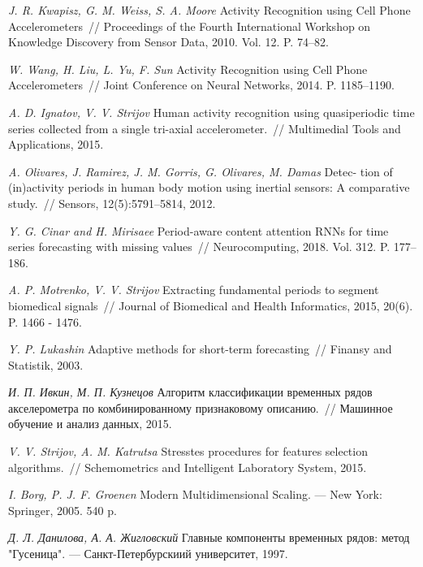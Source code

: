 \documentclass[12pt, twoside]{article}
\numberwithin{equation}{section}
\begin{document}
\begin{thebibliography}{99}
	\textit{J. R. Kwapisz, G. M. Weiss, S. A. Moore} Activity Recognition using Cell Phone Accelerometers~// Proceedings of the Fourth International Workshop on Knowledge Discovery from Sensor Data, 2010. Vol. 12. P. 74--82.
	
	\textit{W. Wang, H. Liu, L. Yu, F. Sun} Activity Recognition using Cell Phone Accelerometers~// Joint Conference on Neural Networks, 2014. P. 1185--1190.
	
	\textit{A. D. Ignatov, V. V. Strijov} Human activity recognition using quasiperiodic time series collected from a single tri-axial accelerometer.~// Multimedial Tools and Applications, 2015.
	
	\textit{A. Olivares, J. Ramirez, J. M. Gorris, G. Olivares, M. Damas} Detec- tion of (in)activity periods in human body motion using inertial sensors: A comparative study.~// Sensors, 12(5):5791–5814, 2012.
	
	\textit{Y. G. Cinar and H. Mirisaee} Period-aware content attention RNNs for time series forecasting with missing values~// Neurocomputing, 2018. Vol. 312. P. 177--186.
	
	\textit{A. P. Motrenko, V. V. Strijov} Extracting fundamental periods to segment biomedical signals~// Journal of Biomedical and Health Informatics, 2015, 20(6). P. 1466 - 1476.
	
	\textit{Y. P. Lukashin} Adaptive methods for short-term forecasting~// Finansy and Statistik, 2003.
	
	\textit{И. П. Ивкин,  М. П. Кузнецов} Алгоритм классификации временных рядов акселерометра по комбинированному признаковому описанию.~// Машинное обучение и анализ данных, 2015.
	
	\textit{V. V. Strijov, A. M. Katrutsa} Stresstes procedures for features selection algorithms.~// Schemometrics and Intelligent Laboratory System, 2015.
	
	\textit{I. Borg, P. J. F. Groenen} Modern Multidimensional Scaling. --- New York: Springer, 2005. 540 p.
	
	
	\textit{Д. Л. Данилова, А. А. Жигловский} Главные компоненты временных рядов: метод "Гусеница". --- Санкт-Петербурскиий университет, 1997.
	

	
\end{thebibliography}
\end{document}
